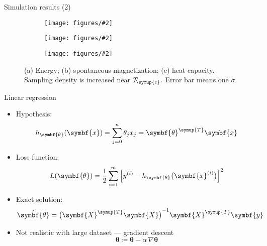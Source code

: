 \documentclass[aspectratio=169]{beamer}
\def\Tc{T_{\!\symup{c}}}
\def\trans{{\symup{T}}}
\def\bm#1{{\symbf{#1}}}
\newcommand\imageinput[2][]{\texttt{[image: figures/\#2]}}
\begin{document}
\begin{frame}{Simulation results (2)}
\begin{figure}
  \centering
  \begin{subfigure}[b]{0.32\textwidth}
    \centering
    \imageinput[height=3.4cm]{ising-energy.pdf}
  \end{subfigure}
  \begin{subfigure}[b]{0.32\textwidth}
    \centering
    \imageinput[height=3.4cm]{ising-magnet.pdf}
  \end{subfigure}
  \begin{subfigure}[b]{0.32\textwidth}
    \centering
    \imageinput[height=3.4cm]{ising-cv.pdf}
  \end{subfigure}
  \caption{(a) Energy; (b) spontaneous magnetization; (c) heat capacity.
    Sampling density is increased near $\Tc$. Error bar means one $\sigma$.}
\end{figure}
\end{frame}

\begin{frame}{Linear regression}
\begin{itemize}
  \item Hypothesis:
    \[ h_\bm{\theta} (\bm{x}) = \sum_{j=0}^n \theta_j x_j = \bm{\theta}^\trans \bm{x} \]
  \item Loss function:
    \[
      L(\bm{\theta})
      = \frac{1}{2} \sum_{i=1}^m \qty\Big[y^{(i)} - h_\bm{\theta}\qty\big(\bm{x}^{(i)})]^2
    \]
  \item Exact solution:
    \[ \hat{\bm{\theta}} = \qty\big(\bm{X}^\trans\bm{X})^{-1} \bm{X}^\trans \bm{y} \]
  \item Not realistic with large dataset --- \alert{gradient descent}
    \[ \bm{\theta} \coloneq \bm{\theta} - \alpha \, \nabla\bm{\theta} \]
\end{itemize}
\end{frame}
\end{document}

